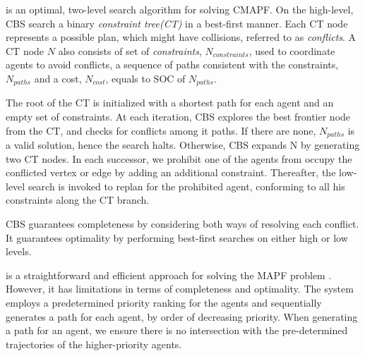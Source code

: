\documentclass[letterpaper]{article} %
\def\
UrlFont{\rm}  %
\newcommand{\roni}[1]{\textbf{[\color{orange}RONI:#1]}}
\theoremstyle{definition}
\begin{document}

 \cite{sharon2015conflict} is an optimal, two-level search algorithm for solving CMAPF. On the high-level, CBS search a binary \emph{constraint tree(CT)} in a best-first manner. Each CT node represents a possible plan, which might have collisions, referred to as \emph{conflicts}. A CT node $N$ also consists of set of \emph{constraints}, $N_{constraints}$, used to coordinate agents to avoid conflicts, a sequence of paths consistent with the constraints, $N_{paths}$ and a cost, $N_{cost}$, equals to SOC of $N_{paths}$.

The root of the CT is initialized with a shortest path for each agent and an empty set of constraints. At each iteration, CBS explores the best frontier node from the CT, and checks for conflicts among it paths. If there are none, $N_{paths}$ is a valid solution, hence the search halts. Otherwise, CBS expands N by generating two CT nodes. In each successor, we prohibit one of the agents from occupy the conflicted vertex or edge by adding an additional constraint. Thereafter, the low-level search is invoked to replan for the prohibited agent, conforming to all his constraints along the CT branch.

CBS guarantees completeness by considering both ways of resolving each conflict. It guarantees optimality by performing best-first searches on either high or low levels.

 is a straightforward and efficient approach for solving the MAPF problem \cite{silver2005cooperative}. However, it has limitations in terms of completeness and optimality. The system employs a predetermined priority ranking for the agents and sequentially generates a path for each agent, by order of decreasing priority. When generating a path for an agent, we ensure there is no intersection with the pre-determined trajectories of the higher-priority agents.
\end{document}
